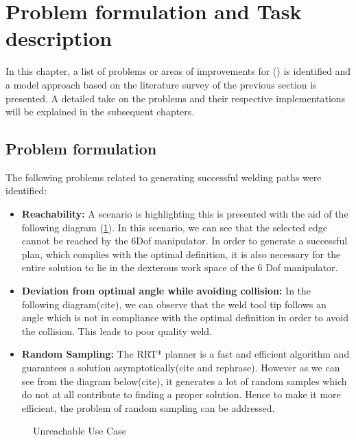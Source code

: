 \newpage
\section{Problem formulation and Task description}
\label{sec:pf}
In this chapter, a list of problems or areas of improvements for (\citet{DiazP2016}) is identified and a model approach based on the literature survey of the previous section is presented. A detailed take on the problems and their respective implementations will be explained in the subsequent chapters.
\subsection{Problem formulation}
The following problems related to generating successful welding paths were identified:
\begin{itemize}
\item \textbf{Reachability:} A scenario is highlighting this is presented with the aid of the following diagram (\ref{fig:pf1}). In this scenario, we can see that the selected edge cannot be reached by the 6Dof manipulator. In order to generate a successful plan, which complies with the optimal definition, it is also necessary for the entire solution to lie in the dexterous work space of the 6 Dof manipulator.
\item \textbf{Deviation from optimal angle while avoiding collision:} In the following diagram(cite), we can observe that the weld tool tip follows an angle which is not in compliance with the optimal definition in order to avoid the collision. This leads to poor quality weld.
\item \textbf{Random Sampling:} The RRT* planner is a fast and efficient algorithm and guarantees  a solution asymptotically(cite and rephrase). However as we can see from the diagram below(cite), it generates a lot of random samples which do not at all contribute to finding a proper solution. Hence to make it more efficient, the problem of random sampling can be addressed.
\end{itemize}
\begin{figure}[!ht] %
	\centering
	\caption{Unreachable Use Case}
	\label{fig:pf1}
\end{figure} 

